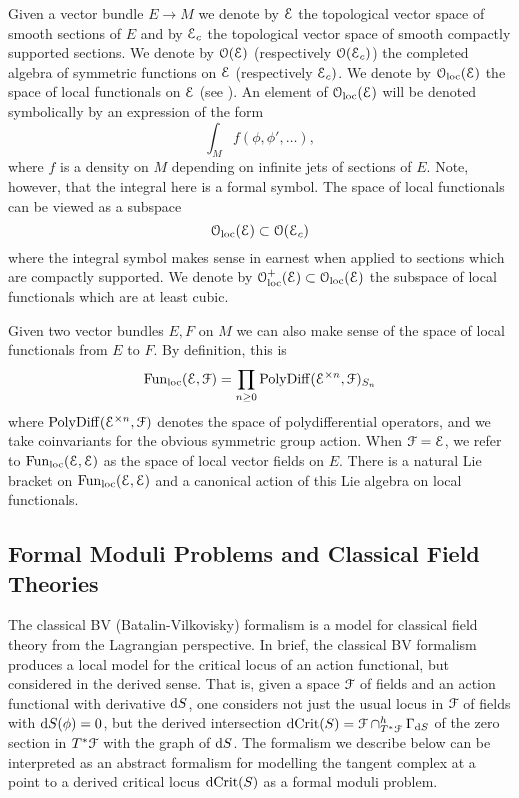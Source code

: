 \documentclass[10pt, oneside]{article}
\begin{document}
Given a vector bundle $E\rightarrow M$ we denote by $\mathcal E$ the topological vector space of smooth sections of $E$ and by $\mathcal E_c$ the topological vector space of smooth compactly supported sections.
We denote by $\mathcal O(\mathcal E)$ (respectively $\mathcal O(\mathcal E_c)$) the completed algebra of symmetric functions on $\mathcal E$ (respectively $\mathcal E_c)$. 
We denote by $\mathcal{O}_{\rm loc}(\mathcal E)$ the space of local functionals on $\mathcal E$ (see \cite[Definition 4.5.1.1]{Book2}). An element of $\mathcal{O}_{\rm loc}(\mathcal E)$ will be denoted symbolically by an expression of the form
\[\int_M f (\phi, \phi', \dots),\]
where $f$ is a density on $M$ depending on infinite jets of sections of $E$. Note, however, that the integral here is a formal symbol. 
The space of local functionals can be viewed as a subspace
\[
\mathcal{O}_{\rm loc}(\mathcal E) \subset \mathcal O(\mathcal E_c)
\]
where the integral symbol makes sense in earnest when applied to sections which are compactly supported.
We denote by $\mathcal{O}_{\rm loc}^+(\mathcal E)\subset \mathcal{O}_{\rm loc}(\mathcal E)$ the subspace of local functionals which are at least cubic.

Given two vector bundles $E, F$ on $M$ we can also make sense of the space of local functionals from $E$ to $F$.
By definition, this is 
\[
{\rm Fun}_{\rm loc}(\mathcal E, \mathcal F) = \prod_{n \geq 0} {\rm PolyDiff}(\mathcal E^{\times n}, \mathcal F)_{S_n}
\]
where ${\rm PolyDiff}(\mathcal E^{\times n}, \mathcal F)$ denotes the space of polydifferential operators, and we take coinvariants for the obvious symmetric group action.
When $\mathcal F = \mathcal E$, we refer to ${\rm Fun}_{\rm loc}(\mathcal E, \mathcal E)$ as the space of local vector fields on $E$. 
There is a natural Lie bracket on ${\rm Fun}_{\rm loc}(\mathcal E, \mathcal E)$ and a canonical action of this Lie algebra on local functionals. 

\subsection{Formal Moduli Problems and Classical Field Theories}
\label{sect:FMPs}

The classical BV (Batalin-Vilkovisky) formalism \cite{BatalinVilkovisky} is a model for classical field theory from the Lagrangian perspective.  In brief, the classical BV formalism produces a local model for the critical locus of an action functional, but considered in the derived sense.  That is, given a space $\mathcal{F}$ of fields and an action functional with derivative ${\rm d} S$, one considers not just the usual locus in $\mathcal{F}$ of fields with ${\rm d} S(\phi) = 0$, but the derived intersection $\mathrm{dCrit}(S) = \mathcal{F} \cap^h_{T^*\mathcal{F}} \Gamma_{{\rm d} S}$ of the zero section in $T^*\mathcal{F}$ with the graph of ${\rm d} S$.  The formalism we describe below can be interpreted as an abstract formalism for modelling the tangent complex at a point to a derived critical locus $\mathrm{dCrit}(S)$ as a formal moduli problem.
\end{document}
